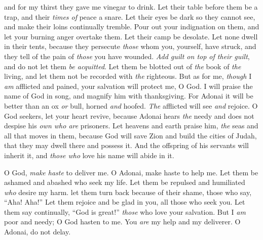 \begin{biblechapter}
and for my thirst they gave me vinegar to drink.
\verse Let their table before them be a trap, 
and their \textit{times of} peace a snare.
\verse Let their eyes be dark so they cannot see, 
and make their loins continually tremble.
\verse Pour out your indignation on them, 
and let your burning anger overtake them.
\verse Let their camp be desolate. 
Let none dwell in their tents,
\verse because they persecute \textit{those} whom you, yourself, have struck, 
and they tell of the pain of \textit{those} you have wounded.
\verse \textit{Add guilt on top of their guilt}, 
and do not let them \textit{be acquitted}.
\verse Let them be blotted out of \textit{the} book of \textit{the} living, 
and let them not be recorded with \textit{the} righteous.
\verse But as for me, \textit{though} I \textit{am} afflicted and pained, 
your salvation will protect me, O God.
\verse I will praise the name of God in song, 
and magnify him with thanksgiving.
\verse For Adonai it will be better than an ox \textit{or} bull, 
horned \textit{and} hoofed.
\verse \textit{The} afflicted will see \textit{and} rejoice. 
O God seekers, let your heart revive,
\verse because Adonai hears \textit{the} needy 
and does not despise his \textit{own who are} prisoners.
\verse Let heavens and earth praise him, 
\textit{the} seas and all that moves in them,
\verse because God will save Zion 
and build the cities of Judah, 
that they may dwell there and possess it.
\verse And the offspring of his servants will inherit it, 
and \textit{those who} love his name will abide in it.
\end{biblechapter}

\begin{biblechapter} %
 O God, \textit{make haste} to deliver me. 
O Adonai, make haste to help me.
\verse Let them be ashamed and abashed 
who seek my life. 
Let them be repulsed and humiliated 
\textit{who} desire my harm.
\verse let them turn back because of their shame, 
those who say, “Aha! Aha!”
\verse Let them rejoice and be glad in you, 
all those who seek you. 
Let them say continually, “God is great!” 
\textit{those} who love your salvation.
\verse But I \textit{am} poor and needy; 
O God hasten to me. 
You \textit{are} my help and my deliverer. 
O Adonai, do not delay.
\end{biblechapter}


